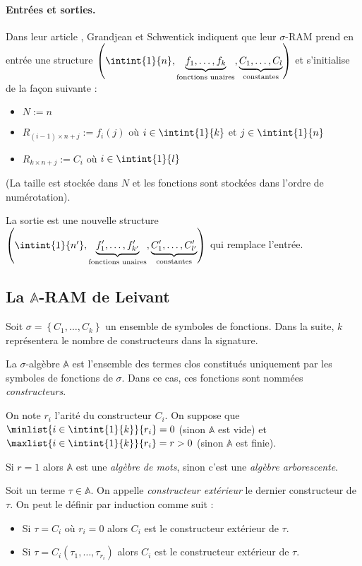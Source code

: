 \documentclass{article}
\newcommand{\bbA}{\mathbb{A}}
\begin{document}
		
		\paragraph{Entrées et sorties.}
		Dans leur article , Grandjean et Schwentick indiquent que leur $\sigma$-RAM prend en entrée une structure $\left( \intint{1}{n}, \underset{\text{fonctions unaires}}{\underbrace{f_1, \dots, f_k}},  \underset{\text{constantes}}{\underbrace{C_1, \dots, C_l}}\right)$ et s'initialise de la façon suivante : 
		
		\begin{itemize}[itemsep=-1mm]
			\item 	$N := n$
			\item 	$R_{(i-1) \times n + j} := f_i(j)$ où $i \in \intint{1}{k}$ et $j \in \intint{1}{n}$
			\item 	$R_{k \times n + j} := C_i$ où $i \in \intint{1}{l}$
		\end{itemize}
		(La taille est stockée dans $N$ et les fonctions sont stockées dans l'ordre de numérotation).
		
		La sortie est une nouvelle structure $\left( \intint{1}{n'}, \underset{\text{fonctions unaires}}{\underbrace{f'_1, \dots, f'_{k'}}},  \underset{\text{constantes}}{\underbrace{C'_1, \dots, C'_{l'}}}\right)$ qui remplace l'entrée.
		
		
		
		\subsection{La $\bbA$-RAM de Leivant}
		
		
		\begin{definition}[Algèbre]
			Soit $\sigma = \left\lbrace C_1, \dots, C_k \right\rbrace$ un ensemble de symboles de fonctions. Dans la suite, $k$ représentera le nombre de constructeurs dans la signature.
			
			La $\sigma$-algèbre $\bbA$ est l'ensemble des termes clos constitués uniquement par les symboles de fonctions de $\sigma$. Dans ce cas, ces fonctions sont nommées \emph{constructeurs}. 
			
			On note $r_i$ l'arité du constructeur $C_i$. On suppose que $\minlist{i\in\intint{1}{k}}{r_i} = 0$ (sinon $\bbA$ est vide) et $\maxlist{i\in\intint{1}{k}}{r_i} = r > 0$ (sinon $\bbA$ est finie).
			
			Si $r = 1$ alors $\mathbb{A}$ est une \emph{algèbre de mots}, sinon c'est une \emph{algèbre arborescente}.
			
			Soit un terme $\tau \in \bbA$. On appelle \emph{constructeur extérieur} le dernier constructeur de $\tau$. On peut le définir par induction comme suit :
			
			\begin{itemize}[itemsep=-1mm]
				\item 	Si $\tau = C_i$ où $r_i = 0$ alors $C_i$ est le constructeur extérieur de $\tau$.
				\item 	Si $\tau = C_i(\tau_1, \dots, \tau_{r_i})$ alors $C_{i}$ est le constructeur extérieur de $\tau$.
			\end{itemize}
		\end{definition}
		
\end{document}
